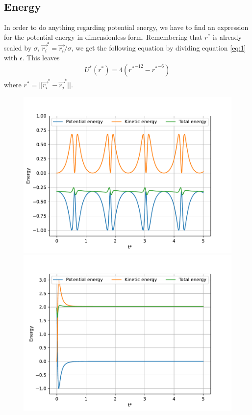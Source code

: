 \documentclass[a4paper,10pt,english]{article}
\begin{document}
\newpage

\subsection{Energy} \label{2c}

In order to do anything regarding potential energy, we have to find an expression for the potential energy in dimensionless form. Remembering that $r^*$ is already scaled by $\sigma$, $\Vec{r_i}^* = \Vec{r_i} / \sigma$, we get the following equation by dividing equation \ref{eq:1} with $\epsilon$. This leaves
\begin{align}
    U^*(r^*) = 4 
    \left(
        {r^*}^{-12} - {r^*}^{-6} 
    \right)
\end{align}
where $r^*=||\Vec{r_i}^* - \Vec{r_j}^*||$.

\begin{figure}[h]
    \centering
    \begin{minipage}{0.5\textwidth}
        \centering
        \includegraphics[width=1.05\textwidth]{../figures/2_c_i_1.pdf}
    \end{minipage}\hfill
    \begin{minipage}{0.5\textwidth}
        \centering
        \includegraphics[width=1.05\textwidth]{../figures/2_c_i_2.pdf}

\end{minipage}
\end{figure}
\end{document}
